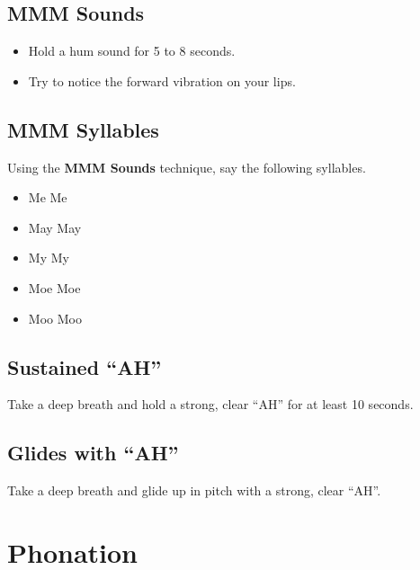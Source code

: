 \documentclass[12pt]{article}
\begin{document}
\subsection*{MMM Sounds}
\begin{itemize}
\item Hold a hum sound for 5 to 8 seconds.
\item Try to notice the forward vibration on your lips.
\end{itemize}

\subsection*{MMM Syllables}
Using the \textbf{MMM Sounds} technique, say the following syllables.
\begin{itemize}
\item Me Me
\item May May
\item My My
\item Moe Moe
\item Moo Moo
\end{itemize}

\subsection*{Sustained ``AH''}
Take a deep breath and hold a strong, clear ``AH'' for at least 10 seconds.

\subsection*{Glides with ``AH''}
Take a deep breath and glide up in pitch with a strong, clear ``AH''.

\pagebreak
\section*{Phonation}
\end{document}
